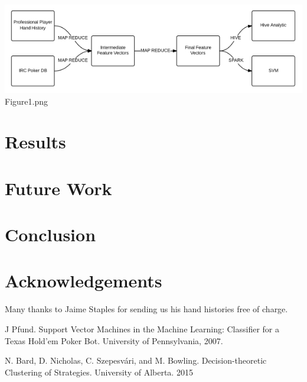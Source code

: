 \documentclass[twoside]{article}
\begin{document}
\begin{multicols}{2}
\includegraphics[width=1\columnwidth]{Flowchart.png}
Figure1.png



\section{Results}


\section{Future Work}


\section{Conclusion}


\section{Acknowledgements}

Many thanks to Jaime Staples for sending us his hand histories free of charge. 



\begin{thebibliography}{99} %
 J Pfund. Support Vector Machines in the Machine Learning: Classifier for a Texas Hold'em Poker Bot.  University of Pennsylvania, 2007.

 N. Bard, D. Nicholas, C. Szepesvári, and M. Bowling. Decision-theoretic Clustering of Strategies. University of Alberta. 2015


\end{thebibliography}
\end{multicols}
\end{document}
